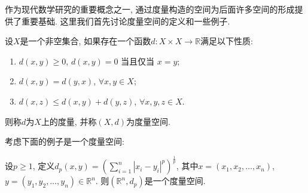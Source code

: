 \documentclass[theorem=false,mathfont=none,openany,sub3section]{easybook}
\begin{document}
作为现代数学研究的重要概念之一, 通过度量构造的空间为后面许多空间的形成提供了重要基础. 这里我们首先讨论度量空间的定义和一些例子.\par

\begin{definition}
  设$X$是一个非空集合, 如果存在一个函数$d: X \times X \to \mathbb{R}$满足以下性质:\par
  \begin{enumerate}
    \item $d(x, y) \geq 0$, $d(x, y) = 0$ 当且仅当 $x = y$;
    \item $d(x, y) = d(y, x)$, $\forall x, y \in X$;
    \item $d(x, z) \leq d(x, y) + d(y, z)$, $\forall x, y, z \in X$.
  \end{enumerate}
  则称$d$为$X$上的度量, 并称$(X, d)$为度量空间.\par
\end{definition}

考虑下面的例子是一个度量空间:\par

\begin{example}
  设$p\geqslant 1$, 定义$d_p(x,y) = \left( \sum_{i=1}^{n} |x_i - y_i|^p \right)^{\frac{1}{p}}$, 其中$x = (x_1, x_2, \ldots, x_n)$, $y = (y_1, y_2, \ldots, y_n) \in \mathbb{R}^n$. 则$(\mathbb{R}^n, d_p)$是一个度量空间.\par
\end{example}






\backmatter
\end{document}
